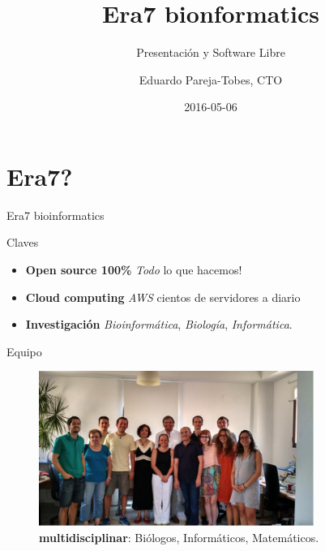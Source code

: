 \documentclass[12pt,compress]{beamer}
\title{Era7 bionformatics}
\subtitle{Presentación y Software Libre}
\author{Eduardo Pareja-Tobes, CTO}
\date{2016-05-06}
\institute{
  \href{http://era7bioinformatics.com}{{Era7} {\color{Grey-Light}bioinformatics}} - {\color{Salmon-Dark}oh}{\color{LightAmber-Dark}no}{\color{Grey}sequences}{\color{Salmon-Dark}!}
}
\let\OldHref\href
\renewcommand{\href}[2]{\OldHref[pdfnewwindow]{#1}{{\textbf{#2}}}}
\providecommand{\tightlist}{%
\setlength{\itemsep}{0pt}\setlength{\parskip}{0pt}}
\begin{document}
\maketitle


% 
\section{Era7?}\label{era7}

\begin{frame}{Era7 bioinformatics}


\begin{block}{Claves}

\begin{itemize}
\tightlist
\item
  \textbf{Open source 100\%} \emph{Todo} lo que hacemos!
\item
  \textbf{Cloud computing} \emph{AWS} cientos de servidores a diario
\item
  \textbf{Investigación} \emph{Bioinformática}, \emph{Biología},
  \emph{Informática}.
\end{itemize}

\end{block}

\end{frame}

\begin{frame}{Equipo}

\begin{figure}[htbp]
\centering
\includegraphics[width=0.80000\textwidth]{images/equipo.jpg}
\caption{\textbf{multidisciplinar}: Biólogos, Informáticos,
Matemáticos.}
\end{figure}

\end{frame}
\end{document}
